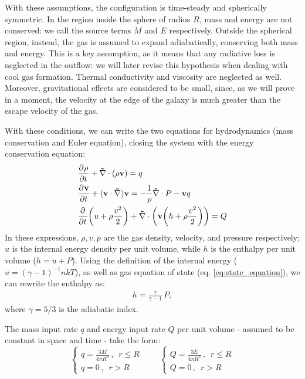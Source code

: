 With these assumptions, the configuration is time-steady and spherically symmetric. In the region inside the sphere of radius $R$, mass and energy are not conserved: we call the source terms $\dot{M}$ and $\dot{E}$ respectively. Outside the spherical region, instead, the gas is assumed to expand adiabatically, conserving both mass and energy. This is a key assumption, as it means that any radiative loss is neglected in the outflow: we will later revise this hypothesis when dealing with cool gas formation. Thermal conductivity and viscosity are neglected as well. Moreover, gravitational effects are considered to be small, since, as we will prove in a moment, the velocity at the edge of the galaxy is much greater than the escape velocity of the gas. 

With these conditions, we can write the two equations for hydrodynamics (mass conservation and Euler equation), closing the system with the energy conservation equation:
\begin{subequations}
\begin{align}
    &\pder{\rho}{t} +\mathbf{\nabla} \cdot (\rho \mathbf{v})=q\\
    &\pder{\mathbf{v}}{t} + (\mathbf{v}\cdot \mathbf{\nabla})\mathbf{v} = - \frac{1}{\rho}\mathbf{\nabla} \cdot P - \mathbf{v}q\\
    &\pder{}{t}\bigg(u+\rho\frac{v^2}{2}\bigg)+\mathbf{\nabla}\cdot\bigg(\mathbf{v}\bigg(h+\rho \frac{v^2}{2}\bigg)\bigg)=Q
\end{align}
\end{subequations}
In these expressions, $\rho, v, p$ are the gas density, velocity, and pressure respectively; $u$ is the internal energy density per unit volume, while $h$ is the enthalpy per unit volume ($h=u+P$). Using the definition of the internal energy ($u=(\gamma -1)^{-1}nkT$), as well as gas equation of state (eq. \ref{eq:state_equation}), we can rewrite the enthalpy as: 
\begin{align}
   h = \frac{\gamma}{\gamma -1} \,P,
\end{align}
where $\gamma = 5/3$ is the adiabatic index.

The mass input rate $q$ and energy input rate $Q$ per unit volume - assumed to be constant in space and time - take the form:
\begin{equation}
\begin{cases} q=\frac{3\dot{M}}{4\pi R^3}\,, \,\,\,r\le R\\ q=0\,, \,\,\,r> R \end{cases}
\qquad \begin{cases} Q=\frac{3\dot{E}}{4\pi R^3}\,, \,\,\,r\le R\\ Q=0\,, \,\,\,r> R \end{cases}
\end{equation}

